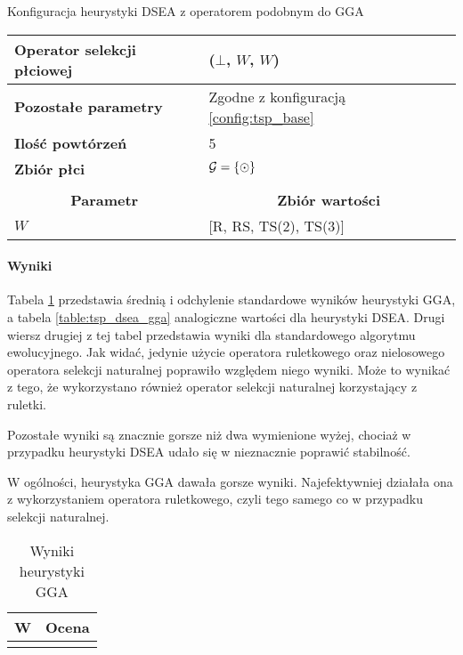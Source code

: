 \documentclass[./FM_mgr.tex]{subfiles}
\begin{document}
\begin{config}
	\caption{Konfiguracja heurystyki DSEA z operatorem podobnym do GGA \label{config:tsp_dsea_gga}}
	\begin{tabularx}{\linewidth}{lX}
		\hline
		\multicolumn{1}{|l|}{{\bf Operator selekcji płciowej}} &
		\multicolumn{1}{l|}{\opName{stdGenSel}($\bot$, $W$, $W$)} \\ 
		\hline
		\multicolumn{1}{|l|}{{\bf Pozostałe parametry}} & 
		\multicolumn{1}{l|}{Zgodne z konfiguracją \ref{config:tsp_base}} \\ 
		\hline
		\multicolumn{1}{|l|}{{\bf Ilość powtórzeń}} &
		\multicolumn{1}{l|}{5} \\ 
		\hline
		\multicolumn{1}{|l|}{{\bf Zbiór płci}} & 
		\multicolumn{1}{l|}{$\mathcal{G} = \{ \odot \}$} \\ 
		\hline
		\hline
		& \\ 
		\hline
		\multicolumn{1}{|c|}{{\bf Parametr}} & 
		\multicolumn{1}{c|}{{\bf Zbiór wartości}} \\ 
		\hline \hline
		\multicolumn{1}{|l|}{$W$} & 
		\multicolumn{1}{l|}{[R, RS, TS(2), TS(3)]} \\ 
		\hline
	\end{tabularx}
\end{config}

\paragraph{Wyniki} Tabela \ref{table:tsp_results_gga} przedstawia średnią i odchylenie standardowe wyników heurystyki GGA, a tabela \ref{table:tsp_dsea_gga} analogiczne wartości dla heurystyki DSEA.
Drugi wiersz drugiej z tej tabel przedstawia wyniki dla standardowego algorytmu ewolucyjnego.
Jak widać, jedynie użycie operatora ruletkowego oraz nielosowego operatora selekcji naturalnej poprawiło względem niego wyniki. 
Może to wynikać z tego, że wykorzystano również operator selekcji naturalnej korzystający z ruletki.

Pozostałe wyniki są znacznie gorsze niż dwa wymienione wyżej, chociaż w przypadku heurystyki DSEA udało się w nieznacznie poprawić stabilność.

W ogólności, heurystyka GGA dawała gorsze wyniki.
Najefektywniej działała ona z wykorzystaniem operatora ruletkowego, czyli tego samego co w przypadku selekcji naturalnej.

\begin{table}[h]
	\caption{Wyniki heurystyki GGA \label{table:tsp_results_gga}}
	\centering
	\begin{tabular}{|l|r@{$\pm$}l|}
		\hline
		\multicolumn{1}{|c|}{{\bf W}} & \multicolumn{2}{c|}{{\bf Ocena}} \\ \hline \hline
		\insertData{tsp_gga}
	\end{tabular}
\end{table}
\end{document}
